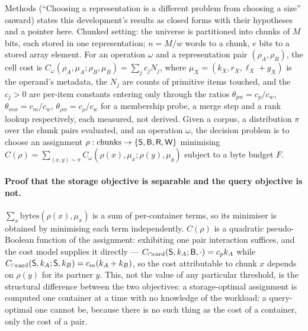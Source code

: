 Methods (``Choosing a representation is a different problem from choosing a size'' onward) states
this development's results as closed forms with their hypotheses and a pointer here. Chunked setting:
the universe is partitioned into chunks of $M$ bits, each stored in one representation; $n=M/w$ words
to a chunk, $e$ bits to a stored array element. For an operation $\omega$ and a representation pair
$(\rho_A,\rho_B)$, the cell cost is $C_\omega(\rho_A,\mu_A;\rho_B,\mu_B)=\sum_j c_j N_j$, where
$\mu_X=(k_X,r_X,\ell_X+g_X)$ is the operand's metadata, the $N_j$ are counts of primitive items
touched, and the $c_j>0$ are per-item constants entering only through the ratios
$\theta_{pw}=c_p/c_w$, $\theta_{mw}=c_m/c_w$, $\theta_{\rho w}=c_\rho/c_w$ for a membership probe, a
merge step and a rank lookup respectively, each measured, not derived. Given a corpus, a distribution
$\pi$ over the chunk pairs evaluated, and an operation $\omega$, the decision problem is to
choose an assignment $\rho:\text{chunks}\to\{\textsf{S},\textsf{B},\textsf{R},\textsf{W}\}$ minimising
$C(\rho)=\sum_{(x,y)\sim\pi}C_\omega(\rho(x),\mu_x;\rho(y),\mu_y)$ subject to a byte budget $F$.

\paragraph*{Proof that the storage objective is separable and the query objective is not.}
$\sum_x\mathrm{bytes}(\rho(x),\mu_x)$ is a sum of per-container terms, so its minimiser is obtained by
minimising each term independently. $C(\rho)$ is a quadratic pseudo-Boolean function of the
assignment: exhibiting one pair interaction suffices, and the cost model supplies it directly ---
$C_{\cap\mathrm{card}}(\textsf{S},k_A;\textsf{B},\cdot)=c_pk_A$ while $C_{\cap\mathrm{card}}(\textsf{S},k_A;\textsf{S},k_B)=c_m(k_A+k_B)$,
so the cost attributable to chunk $x$ depends on $\rho(y)$ for its partner $y$. This, not the value of
any particular threshold, is the structural difference between the two objectives: a storage-optimal
assignment is computed one container at a time with no knowledge of the workload; a query-optimal one
cannot be, because there is no such thing as the cost of a container, only the cost of a pair.

